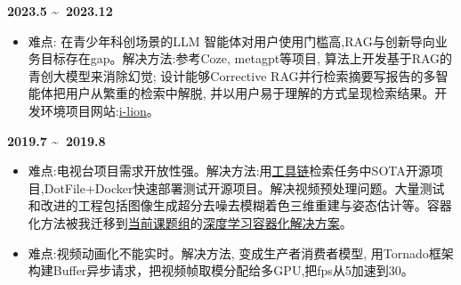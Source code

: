 \documentclass[UTF8,AutoFakeBold]{resume}
\begin{document}
{\large\textbf{2023.5 \textasciitilde \ 2023.12}}
    \begin{itemize}
      \item \kaishu 难点: 在青少年科创场景的LLM 智能体对用户使用门槛高,RAG与创新导向业务目标存在gap。解决方法:参考Coze, metagpt等项目, 算法上开发基于RAG的青创大模型来消除幻觉; 设计能够Corrective RAG并行检索摘要写报告的多智能体把用户从繁重的检索中解脱, 并以用户易于理解的方式呈现检索结果。开发环境项目网站:\href{http://106.14.61.143:8889/ai_chat}{i-lion}。
    \end{itemize}

{\large\textbf{2019.7 \textasciitilde \ 2019.8}}
    \begin{itemize}
      \item \kaishu 难点:电视台项目需求开放性强。解决方法:用\href{https://zhuanlan.zhihu.com/p/671425463}{工具链}检索任务中SOTA开源项目,DotFile+Docker快速部署测试开源项目。解决视频预处理问题。大量测试和改进的工程包括图像生成超分去噪去模糊着色三维重建与姿态估计等。容器化方法被我迁移到\href{https://ecnuvis.net/}{当前课题组}的\href{https://zhuanlan.zhihu.com/p/682477952}{深度学习容器化解决方案}。
      \item \kaishu 难点:视频动画化不能实时。解决方法, 变成生产者消费者模型, 用Tornado框架构建Buffer异步请求，把视频帧取模分配给多GPU,把fps从5加速到30。
    \end{itemize}

\end{document}
